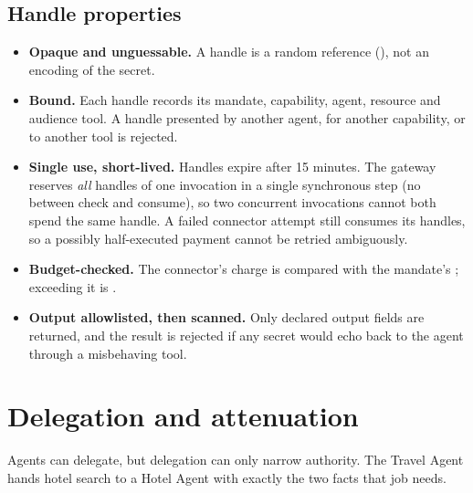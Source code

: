 \documentclass[11pt,a4paper]{article}
\begin{document}
\subsection{Handle properties}
\begin{itemize}
  \item \textbf{Opaque and unguessable.} A handle is a random reference (), not an encoding of the secret.
  \item \textbf{Bound.} Each handle records its mandate, capability, agent, resource and audience tool. A handle presented by another agent, for another capability, or to another tool is rejected.
  \item \textbf{Single use, short-lived.} Handles expire after 15 minutes. The gateway reserves \emph{all} handles of one invocation in a single synchronous step (no  between check and consume), so two concurrent invocations cannot both spend the same handle. A failed connector attempt still consumes its handles, so a possibly half-executed payment cannot be retried ambiguously.
  \item \textbf{Budget-checked.} The connector's charge is compared with the mandate's ; exceeding it is .
  \item \textbf{Output allowlisted, then scanned.} Only declared output fields are returned, and the result is rejected if any secret would echo back to the agent through a misbehaving tool.
\end{itemize}

\section{Delegation and attenuation}\label{sec:delegation}

Agents can delegate, but delegation can only narrow authority. The Travel Agent hands hotel search to a Hotel Agent with exactly the two facts that job needs.
\end{document}

